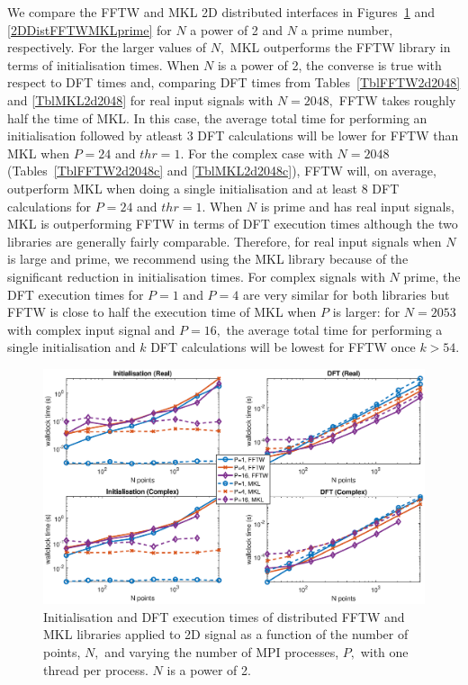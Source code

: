 \documentclass[a4paper]{article}
\begin{document}
We compare the FFTW and MKL 2D distributed interfaces in
Figures~\ref{2DDistFFTWMKL2} and \ref{2DDistFFTWMKLprime} for $N$ a
power of 2 and $N$ a prime number, respectively. For the larger values
of $N,$ MKL outperforms the FFTW library in terms of initialisation
times. When $N$ is a power of 2, the converse is true with respect to
DFT times and, comparing DFT times from Tables~\ref{TblFFTW2d2048}
and \ref{TblMKL2d2048} for real input signals with $N=2048,$ FFTW
takes roughly half the time of MKL. In this case, the average total
time for performing an initialisation followed by atleast 3 DFT
calculations will be lower for FFTW than MKL when $P=24$ and $thr=1.$
For the complex case with $N=2048$ (Tables~\ref{TblFFTW2d2048c} and
\ref{TblMKL2d2048c}), FFTW will, on average, outperform MKL when
doing a single initialisation and at least 8 DFT calculations for
$P=24$ and $thr=1.$ When $N$ is prime and has real input signals, MKL
is outperforming FFTW in terms of DFT execution times although the two
libraries are generally fairly comparable. Therefore, for real input
signals when $N$ is large and prime, we recommend using the MKL
library because of the significant reduction in initialisation
times. For complex signals with $N$ prime, the DFT execution times for
$P=1$ and $P=4$ are very similar for both libraries but FFTW is close
to half the execution time of MKL when $P$ is larger: for $N=2053$
with complex input signal and $P=16,$ the average total time for
performing a single initialisation and $k$ DFT calculations will be
lowest for FFTW once $k>54.$ 


\begin{figure}[htb]
    \centering
    \includegraphics[width=0.9\linewidth]{../results/fftw_mkl_2_2d_mpi.eps}
  \caption{Initialisation and DFT execution times of distributed FFTW and MKL libraries applied to 2D signal as a function of the
    number of points, $N,$ and varying the number of MPI processes, $P,$ with one thread per process. $N$ is a power of 2.}
  \label{2DDistFFTWMKL2}
\end{figure}
\end{document}
